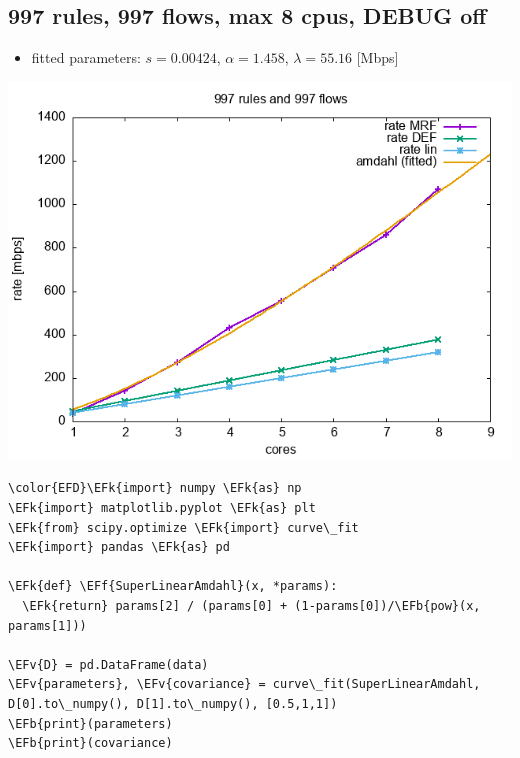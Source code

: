 \documentclass[11pt]{article}
\newcommand{\EFk}[1]{\textcolor{EFk}{#1}} %
\newcommand{\EFb}[1]{\textcolor{EFb}{#1}} %
\newcommand{\EFf}[1]{\textcolor{EFf}{#1}} %
\newcommand{\EFv}[1]{\textcolor{EFv}{#1}} %
\begin{document}
\subsection*{997 rules, 997 flows, max 8 cpus, DEBUG off}
\label{sec:org6ae85d7}
\begin{itemize}
\item fitted parameters: \(s=0.00424\), \(\alpha=1.458\), \(\lambda=55.16\) [Mbps]
\end{itemize}

\begin{center}
\includegraphics[width=.9\linewidth]{plot-997rules-997flows.png}
\end{center}

\begin{Code}
\begin{Verbatim}
\color{EFD}\EFk{import} numpy \EFk{as} np
\EFk{import} matplotlib.pyplot \EFk{as} plt
\EFk{from} scipy.optimize \EFk{import} curve\_fit
\EFk{import} pandas \EFk{as} pd

\EFk{def} \EFf{SuperLinearAmdahl}(x, *params):
  \EFk{return} params[2] / (params[0] + (1-params[0])/\EFb{pow}(x, params[1]))

\EFv{D} = pd.DataFrame(data)
\EFv{parameters}, \EFv{covariance} = curve\_fit(SuperLinearAmdahl, D[0].to\_numpy(), D[1].to\_numpy(), [0.5,1,1])
\EFb{print}(parameters)
\EFb{print}(covariance)
\end{Verbatim}
\end{Code}
\end{document}
